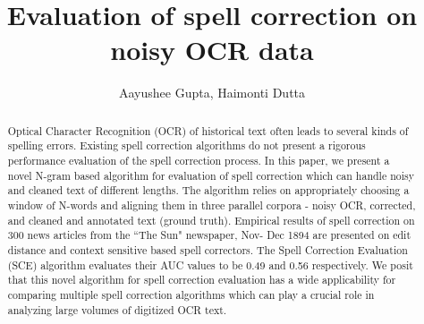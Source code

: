 \documentclass[preprint,11pt]{elsarticle}
\begin{document}
\begin{frontmatter}



\title{Evaluation of spell correction on noisy OCR data}


\author{Aayushee Gupta, Haimonti Dutta}

\address{}



\begin{abstract}
Optical Character Recognition (OCR) of historical text often leads to several kinds of spelling errors. Existing spell correction algorithms do not present a rigorous performance evaluation of the spell correction process. In this paper, we present a novel N-gram based algorithm for evaluation of spell correction which can handle noisy and cleaned text of different lengths.
The algorithm relies on appropriately choosing a window of N-words and aligning them in three parallel corpora - noisy OCR, corrected, and cleaned and annotated text (ground truth). Empirical results of spell correction on 300 news articles from the ``The Sun" newspaper, Nov- Dec 1894 are presented on edit distance and context sensitive based spell correctors. The Spell Correction Evaluation (SCE) algorithm evaluates their AUC values to be 0.49 and 0.56 respectively. We posit that this novel algorithm for spell correction evaluation has a wide applicability for comparing multiple spell correction algorithms which can play a crucial role in analyzing large volumes of digitized OCR text.
\end{abstract}


\end{frontmatter}
\end{document}
